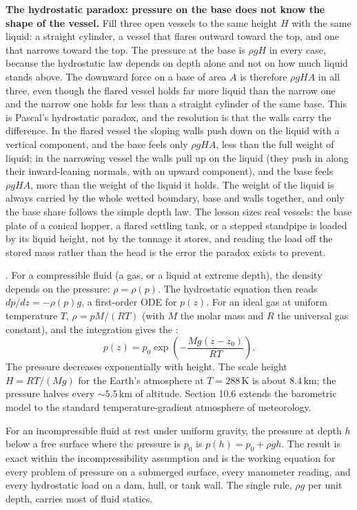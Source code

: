 \begin{mastery}
\textbf{The hydrostatic paradox: pressure on the base does not know the
shape of the vessel.} Fill three open vessels to the same height $H$ with
the same liquid: a straight cylinder, a vessel that flares outward toward
the top, and one that narrows toward the top. The pressure at the base is
$\rho g H$ in every case, because the hydrostatic law depends on depth
alone and not on how much liquid stands above. The downward force on a
base of area $A$ is therefore $\rho g H A$ in all three, even though the
flared vessel holds far more liquid than the narrow one and the narrow one
holds far less than a straight cylinder of the same base. This is Pascal's
hydrostatic paradox, and the resolution is that the walls carry the
difference. In the flared vessel the sloping walls push down on the liquid
with a vertical component, and the base feels only $\rho g H A$, less than
the full weight of liquid; in the narrowing vessel the walls pull up on
the liquid (they push in along their inward-leaning normals, with an
upward component), and the base feels $\rho g H A$, more than the weight of
the liquid it holds. The weight of the liquid is always carried by the
whole wetted boundary, base and walls together, and only the base share
follows the simple depth law. The lesson sizes real vessels: the base
plate of a conical hopper, a flared settling tank, or a stepped standpipe
is loaded by its liquid height, not by the tonnage it stores, and reading
the load off the stored mass rather than the head is the error the paradox
exists to prevent.
\end{mastery}

. For a compressible
fluid (a gas, or a liquid at extreme depth), the density depends
on the pressure: $\rho = \rho(p)$. The hydrostatic equation then
reads $dp/dz = -\rho(p) g$, a first-order ODE for $p(z)$. For an
ideal gas at uniform temperature $T$, $\rho = p M /(R T)$ (with
$M$ the molar mass and $R$ the universal gas constant), and the
integration gives the :
\[
p(z) = p_0 \exp\!\left(-\frac{M g (z - z_0)}{R T}\right).
\]
The pressure decreases exponentially with height. The scale height
$H = RT/(Mg)$ for the Earth's atmosphere at $T = 288\,\text{K}$
is about $8.4\,\si{\kilo\meter}$; the pressure halves every
$\sim 5.5\,\si{\kilo\meter}$ of altitude. Section 10.6 extends
the barometric model to the standard temperature-gradient
atmosphere of meteorology.

\begin{principle}
For an incompressible fluid at rest under uniform gravity, the
pressure at depth $h$ below a free surface where the pressure is
$p_0$ is $p(h) = p_0 + \rho g h$. The result is exact within the
incompressibility assumption and is the working equation for
every problem of pressure on a submerged surface, every manometer
reading, and every hydrostatic load on a dam, hull, or tank wall.
The single rule, $\rho g$ per unit depth, carries most of fluid
statics.
\end{principle}

